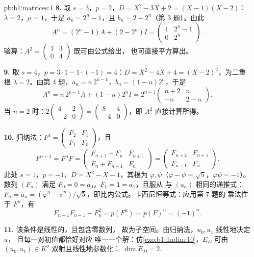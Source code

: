 \begin{solution}{pb:b1:matrices:1}
\textbf{8.} 取 $s = 3$，$p = 2$，$D = X^2 - 3X + 2 = (X - 1)(X -
2)$：$\lambda = 2$，$\mu = 1$，于是 $a_n = 2^n - 1$，且 $b_n = 2 -
2^n$（第 3 题）。由此
\[
A^n = (2^n - 1)A + (2 - 2^n)I
= \begin{pmatrix} 1 & 2^n - 1\\ 0 & 2^n \end{pmatrix}.
\]
验算：$A^2 = \begin{pmatrix} 1 & 3\\ 0 & 4\end{pmatrix}$ 既可由公式给出，
也可直接平方算出。

\textbf{9.} 取 $s = 4$，$p = 3\cdot1 - 1\cdot(-1) = 4$：$D = X^2 -
4X + 4 = (X - 2)^2$，为二重根 $\lambda = 2$。由第 4 题，$a_n
= n\,2^{n-1}$，$b_n = (1 - n)2^n$，于是
\[
A^n = n\,2^{n-1}A + (1 - n)2^n I
= 2^{n-1}\begin{pmatrix} n + 2 & n\\ -n & 2 - n
\end{pmatrix}.
\]
当 $n = 2$ 时：$2\begin{pmatrix} 4 & 2\\ -2 & 0\end{pmatrix} =
\begin{pmatrix} 8 & 4\\ -4 & 0 \end{pmatrix}$，即 $A^2$
直接计算所得。

\textbf{10.} 归纳法：$F^1 = \begin{pmatrix} F_2 & F_1\\ F_1 &
F_0\end{pmatrix}$，且
\[
F^{n+1} = F^n F =
\begin{pmatrix} F_{n+1} + F_n & F_{n+1}\\
F_n + F_{n-1} & F_n \end{pmatrix}
= \begin{pmatrix} F_{n+2} & F_{n+1}\\ F_{n+1} & F_n
\end{pmatrix}.
\]
此处 $s = 1$，$p = -1$，$D = X^2 - X - 1$，其根为 $\varphi,
\psi$（$\varphi - \psi = \sqrt5$，$\varphi\psi = -1$）。
数列 $(F_n)$ 满足 $F_0 = 0 = a_0$，$F_1 = 1 = a_1$，且服从
与 $(a_n)$ 相同的递推式：$F_n = a_n = (\varphi^n -
\psi^n)/\sqrt5$，即比内公式。卡西尼恒等式：应用第 7 题的
乘法性于 $F^n$，有
\[
F_{n+1}F_{n-1} - F_n^2 = p(F^n) = p(F)^n = (-1)^n .
\]

\textbf{11.} 该条件是线性的，且包含零数列，
故为子空间。由归纳法，$u_0, u_1$ 线性地决定 $u$，
且每一对初值都恰好对应
唯一一个解：仿\cref{exo:b1:findim:10}，$E_D$
可由 $(u_0, u_1) \in K^2$ 双射且线性地参数化：
$\dim E_D = 2$.


\end{solution}
